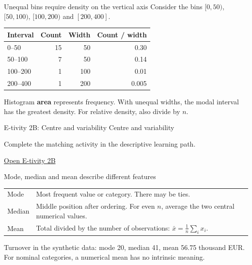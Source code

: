 \begin{frame}{Unequal bins require density on the vertical axis}
Consider the bins $[0,50)$, $[50,100)$, $[100,200)$ and $[200,400]$.
\begin{center}\begin{tabular}{lrrr}\toprule
Interval & Count & Width & Count / width\\\midrule
0--50 & 15 & 50 & 0.30\\
50--100 & 7 & 50 & 0.14\\
100--200 & 1 & 100 & 0.01\\
200--400 & 1 & 200 & 0.005\\\bottomrule
\end{tabular}\par\end{center}
Histogram \textbf{area} represents frequency. With unequal widths, the modal interval has the greatest density. For relative density, also divide by $n$.
\end{frame}

\begin{frame}{E-tivity 2B: Centre and variability}
\Large Centre and variability\par\vspace{5mm}
\normalsize Complete the matching activity in the descriptive learning path.\par
\href{https://silviasaliniunimi.github.io/data-analysis-tax-compliance/02b-centre-spread.html}{Open E-tivity 2B}\par

\end{frame}

\begin{frame}{Mode, median and mean describe different features}
\begin{tabular}{>{\raggedright\arraybackslash}p{}>{\raggedright\arraybackslash}p{}}\toprule
Mode & Most frequent value or category. There may be ties.\\[3mm]
Median & Middle position after ordering. For even $n$, average the two central numerical values.\\[3mm]
Mean & Total divided by the number of observations: $\bar{x}=\frac1n\sum_i x_i$.\\\bottomrule
\end{tabular}\par
\par\vspace{3mm}Turnover in the synthetic data: mode 20, median 41, mean 56.75 thousand EUR.\\
For nominal categories, a numerical mean has no intrinsic meaning.
\end{frame}

